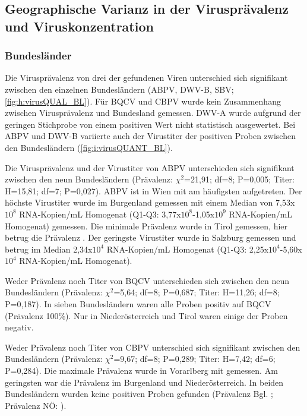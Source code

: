 \subsection{Geographische Varianz in der Virusprävalenz und Viruskonzentration}
\subsubsection{Bundesländer}

Die Virusprävalenz von drei der gefundenen Viren unterschied sich signifikant zwischen den einzelnen Bundesländern (ABPV, DWV-B, SBV; \cref{fig:h:virusQUAL_BL}). Für BQCV und CBPV wurde kein Zusammenhang zwischen Virusprävalenz und Bundesland gemessen. DWV-A wurde aufgrund der geringen Stichprobe von einem positiven Wert nicht statistisch ausgewertet. Bei ABPV und DWV-B variierte auch der Virustiter der positiven Proben zwischen den Bundesländern (\cref{fig:i:virusQUANT_BL}). 

Die Virusprävalenz und der Virustiter von ABPV unterschieden sich signifikant zwischen den neun Bundesländern (Prävalenz: $\chi^2$=21,91; df=8; P=0,005; Titer: H=15,81; df=7; P=0,027). ABPV ist in Wien mit  am häufigsten aufgetreten. Der höchste Virustiter wurde im Burgenland gemessen mit einem Median von 7,53x$10^8$ RNA-Kopien/\si{\milli\liter} Homogenat (Q1-Q3: 3,77x$10^8$-1,05x$10^9$ RNA-Kopien/\si{\milli\liter} Homogenat) gemessen. Die minimale Prävalenz wurde in Tirol gemessen, hier betrug die Prävalenz . Der geringste Virustiter wurde in Salzburg gemessen und betrug im Median 2,34x$10^4$ RNA-Kopien/\si{\milli\liter} Homogenat (Q1-Q3: 2,25x$10^4$-5,60x$10^4$ RNA-Kopien/\si{\milli\liter} Homogenat).

Weder Prävalenz noch Titer von BQCV unterschieden sich zwischen den neun Bundesländern (Prävalenz: $\chi^2$=5,64; df=8; P=0,687; Titer: H=11,26; df=8; P=0,187). In sieben Bundesländern waren alle Proben positiv auf BQCV (Prävalenz 100\%). Nur in Niederösterreich und Tirol waren einige der Proben negativ.

Weder Prävalenz noch Titer von CBPV unterschied sich signifikant zwischen den Bundesländern (Prävalenz: $\chi^2$=9,67; df=8; P=0,289; Titer: H=7,42; df=6; P=0,284). Die maximale Prävalenz wurde in Vorarlberg mit  gemessen. Am geringsten war die Prävalenz im Burgenland und Niederösterreich. In beiden Bundesländern wurden keine positiven Proben gefunden (Prävalenz Bgl. ; Prävalenz NÖ: ).

